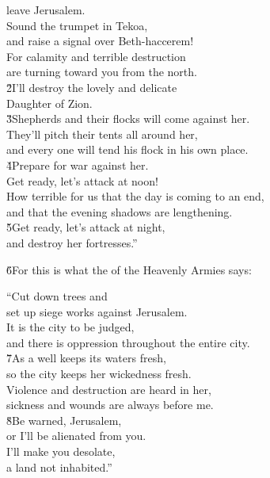 \begin{poetry}
\poeml leave Jerusalem. \\
\poeml Sound the trumpet in Tekoa, \\
\poemll    and raise a signal over Beth-haccerem! \\
\poeml For calamity and terrible destruction \\
\poemll    are turning toward you from the north. \\
\poeml \v{2}I'll destroy the lovely and delicate \\
\poemll    Daughter of Zion. \\
\poeml \v{3}Shepherds and their flocks will come against her. \\
\poemll    They'll pitch their tents all around her, \\
\poemlll       and every one will tend his flock in his own place. \\
\poeml \v{4}Prepare for war against her. \\
\poemll    Get ready, let's attack at noon! \\
\poeml How terrible for us that the day is coming to an end, \\
\poemll    and that the evening shadows are lengthening. \\
\poeml \v{5}Get ready, let's attack at night, \\
\poemll    and destroy her fortresses.''
\end{poetry}

\begin{poetry}
\poeml \v{6}For this is what the  of the Heavenly Armies says:
\end{poetry}

\begin{poetry}
\poeml ``Cut down trees and \\
\poemll    set up siege works against Jerusalem. \\
\poeml It is the city to be judged, \\
\poemll    and there is oppression throughout the entire city. \\
\poeml \v{7}As a well keeps its waters fresh, \\
\poemll    so the city keeps her wickedness fresh. \\
\poeml Violence and destruction are heard in her, \\
\poemll    sickness and wounds are always before me. \\
\poeml \v{8}Be warned, Jerusalem, \\
\poemll    or I'll be alienated from you. \\
\poeml I'll make you desolate, \\
\poemll    a land not inhabited.''
\end{poetry}

